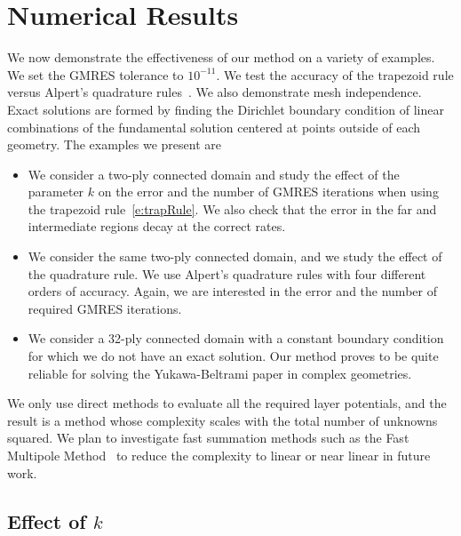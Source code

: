 \documentclass[final]{siamltex}
\begin{document}
\section{Numerical Results}
We now demonstrate the effectiveness of our method on a variety of
examples.  We set the GMRES tolerance to $10^{-11}$.  We test the
accuracy of the trapezoid rule versus Alpert's quadrature
rules~\cite{alpert}.  We also demonstrate mesh independence.  Exact
solutions are formed by finding the Dirichlet boundary condition of
linear combinations of the fundamental solution centered at points
outside of each geometry.  The examples we present are
\begin{itemize}
  \item We consider a two-ply connected domain and study the effect of
  the parameter $k$ on the error and the number of GMRES iterations when
  using the trapezoid rule~\eqref{e:trapRule}.  We also check that the
  error in the far and intermediate regions decay at the correct rates.
  \item We consider the same two-ply connected domain, and we study the
  effect of the quadrature rule.  We use Alpert's quadrature rules with
  four different orders of accuracy.  Again, we are interested in the
  error and the number of required GMRES iterations.
  \item We consider a 32-ply connected domain with a constant boundary
  condition for which we do not have an exact solution.  Our method
  proves to be quite reliable for solving the Yukawa-Beltrami paper in
  complex geometries.
\end{itemize}
We only use direct methods to evaluate all the required layer
potentials, and the result is a method whose complexity scales with the
total number of unknowns squared.  We plan to investigate fast
summation methods such as the Fast Multipole Method~\cite{gre:rok1987}
to reduce the complexity to linear or near linear in future work.

\subsection*{Effect of $k$}
\end{document}
